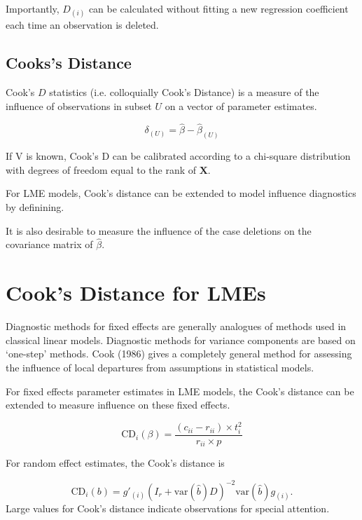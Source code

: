 \documentclass[12pt, a4paper]{article}
\begin{document}
Importantly, $D_{(i)}$ can be calculated without fitting a new regression coefficient each time an observation is deleted.



\subsection{Cooks's Distance}%
 Cook's $D$ statistics (i.e. colloquially Cook's Distance) is a measure of the influence of observations in subset $U$ on a vector of parameter estimates.

\[ \delta_{(U)} = \hat{\beta} - \hat{\beta}_{(U)}\]

If V is known, Cook's D can be calibrated according to a chi-square distribution with degrees of freedom equal to the rank of $\boldsymbol{X}$.




For LME models, Cook's distance can be extended to model influence diagnostics by definining.


It is also desirable to measure the influence of the case deletions on the covariance matrix of $\hat{\beta}$.
\newpage
\section{Cook's Distance for LMEs} %
Diagnostic methods for fixed effects are generally analogues of methods used in classical linear models.
Diagnostic methods for variance components are based on `one-step' methods. Cook (1986) gives a completely general method for assessing the influence of local departures from assumptions in statistical models.

For fixed effects parameter estimates in LME models, the  Cook's distance can be extended to measure influence on these fixed effects.

\[
\mbox{CD}_{i}(\beta) = \frac{(c_{ii} - r_{ii}) \times t^2_{i}}{r_{ii} \times p}
\]

For random effect estimates, the  Cook's distance is

\[
\mbox{CD}_{i}(b) = g{\prime}_{(i)} (I_{r} + \mbox{var}(\hat{b})D)^{-2}\mbox{var}(\hat{b})g_{(i)}.
\]
Large values for Cook's distance indicate observations for special attention.
\end{document}
